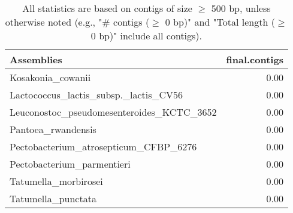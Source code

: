 \documentclass[12pt,a4paper]{article}
\begin{document}
\begin{table}[ht]
\begin{center}
\caption{All statistics are based on contigs of size $\geq$ 500 bp, unless otherwise noted (e.g., "\# contigs ($\geq$ 0 bp)" and "Total length ($\geq$ 0 bp)" include all contigs).}
\begin{tabular}{|l*{1}{|r}|}
\hline
Assemblies & final.contigs \\ \hline
Kosakonia\_cowanii & 0.00 \\ \hline
Lactococcus\_lactis\_subsp.\_lactis\_CV56 & 0.00 \\ \hline
Leuconostoc\_pseudomesenteroides\_KCTC\_3652 & 0.00 \\ \hline
Pantoea\_rwandensis & 0.00 \\ \hline
Pectobacterium\_atrosepticum\_CFBP\_6276 & 0.00 \\ \hline
Pectobacterium\_parmentieri & 0.00 \\ \hline
Tatumella\_morbirosei & 0.00 \\ \hline
Tatumella\_punctata & 0.00 \\ \hline
\end{tabular}
\end{center}
\end{table}
\end{document}
